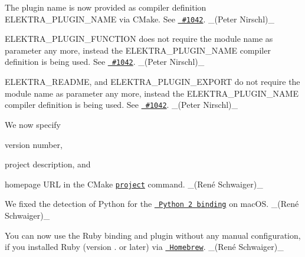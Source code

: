 \begin{DoxyItemize}
\item The plugin name is now provided as compiler definition {\ttfamily E\+L\+E\+K\+T\+R\+A\+\_\+\+P\+L\+U\+G\+I\+N\+\_\+\+N\+A\+ME} via C\+Make. See \href{https://issues.libelektra.org/1042}{\texttt{ \#1042}}. \+\_\+(\+Peter Nirschl)\+\_\+
\item {\ttfamily E\+L\+E\+K\+T\+R\+A\+\_\+\+P\+L\+U\+G\+I\+N\+\_\+\+F\+U\+N\+C\+T\+I\+ON} does not require the module name as parameter any more, instead the {\ttfamily E\+L\+E\+K\+T\+R\+A\+\_\+\+P\+L\+U\+G\+I\+N\+\_\+\+N\+A\+ME} compiler definition is being used. See \href{https://issues.libelektra.org/1042}{\texttt{ \#1042}}. \+\_\+(\+Peter Nirschl)\+\_\+
\item {\ttfamily E\+L\+E\+K\+T\+R\+A\+\_\+\+R\+E\+A\+D\+ME}, and {\ttfamily E\+L\+E\+K\+T\+R\+A\+\_\+\+P\+L\+U\+G\+I\+N\+\_\+\+E\+X\+P\+O\+RT} do not require the module name as parameter any more, instead the {\ttfamily E\+L\+E\+K\+T\+R\+A\+\_\+\+P\+L\+U\+G\+I\+N\+\_\+\+N\+A\+ME} compiler definition is being used. See \href{https://issues.libelektra.org/1042}{\texttt{ \#1042}}. \+\_\+(\+Peter Nirschl)\+\_\+
\item We now specify
\begin{DoxyItemize}
\item version number,
\item project description, and
\item homepage U\+RL in the C\+Make \href{https://cmake.org/cmake/help/latest/command/project.html}{\texttt{ {\ttfamily project}}} command. \+\_\+(René Schwaiger)\+\_\+
\end{DoxyItemize}
\item We fixed the detection of Python for the \href{https://www.libelektra.org/bindings/swig_python2}{\texttt{ Python 2 binding}} on mac\+OS. \+\_\+(René Schwaiger)\+\_\+
\item You can now use the Ruby binding and plugin without any manual configuration, if you installed Ruby (version {.} or later) via \href{http://brew.sh}{\texttt{ Homebrew}}. \+\_\+(René Schwaiger)\+\_\+
\end{DoxyItemize}


